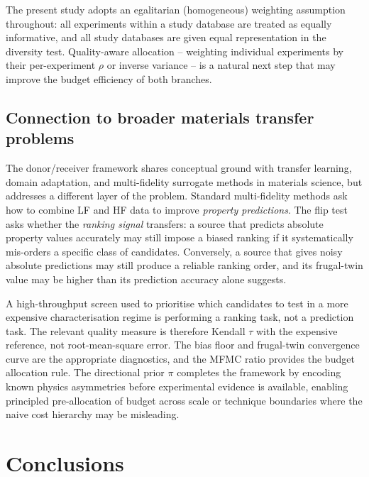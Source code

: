 \documentclass[twoside,twocolumn,9pt]{article}
\begin{document}
The present study adopts an egalitarian (homogeneous) weighting assumption throughout: all experiments within a study database are treated as equally informative, and all study databases are given equal representation in the diversity test. Quality-aware allocation -- weighting individual experiments by their per-experiment $\rho$ or inverse variance -- is a natural next step that may improve the budget efficiency of both branches.

\subsection{Connection to broader materials transfer problems}

The donor/receiver framework shares conceptual ground with transfer learning, domain adaptation, and multi-fidelity surrogate methods in materials science, but addresses a different layer of the problem.\cite{Pan2010TransferLearning,Weiss2016TransferLearningSurvey,Pilania2016MultiFidelityCoKriging,Tran2020MFGP,Ottomano2024DataAggregation} Standard multi-fidelity methods ask how to combine LF and HF data to improve \emph{property predictions}. The flip test asks whether the \emph{ranking signal} transfers: a source that predicts absolute property values accurately may still impose a biased ranking if it systematically mis-orders a specific class of candidates. Conversely, a source that gives noisy absolute predictions may still produce a reliable ranking order, and its frugal-twin value may be higher than its prediction accuracy alone suggests.

A high-throughput screen used to prioritise which candidates to test in a more expensive characterisation regime is performing a ranking task, not a prediction task. The relevant quality measure is therefore Kendall $\tau$ with the expensive reference, not root-mean-square error. The bias floor and frugal-twin convergence curve are the appropriate diagnostics, and the MFMC ratio provides the budget allocation rule.\cite{Peherstorfer2018SurveyMF,Lo2024FrugalTwin} The directional prior $\pi$ completes the framework by encoding known physics asymmetries before experimental evidence is available, enabling principled pre-allocation of budget across scale or technique boundaries where the naive cost hierarchy may be misleading.

\section*{Conclusions}
\end{document}
